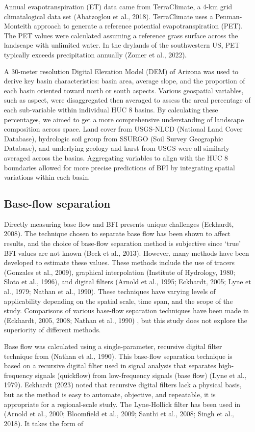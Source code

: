 \documentclass[
]{agujournal2019}
\begin{document}
Annual evapotranspiration (ET) data came from TerraClimate, a 4-km grid
climatalogical data set (Abatzoglou et al., 2018). TerraClimate uses a
Penman-Monteith approach to generate a reference potential
evapotranspiration (PET). The PET values were calculated assuming a
reference grass surface across the landscape with unlimited water. In
the drylands of the southwestern US, PET typically exceeds precipitation
annually (Zomer et al., 2022).

A 30-meter resolution Digital Elevation Model (DEM) of Arizona was used
to derive key basin characteristics: basin area, average slope, and the
proportion of each basin oriented toward north or south aspects. Various
geospatial variables, such as aspect, were disaggregated then averaged
to assess the areal percentage of each sub-variable within individual
HUC 8 basins. By calculating these percentages, we aimed to get a more
comprehensive understanding of landscape composition across space. Land
cover from USGS-NLCD (National Land Cover Database), hydrologic soil
group from SSURGO (Soil Survey Geographic Database), and underlying
geology and karst from USGS were all similarly averaged across the
basins. Aggregating variables to align with the HUC 8 boundaries allowed
for more precise predictions of BFI by integrating spatial variations
within each basin.

\subsection{Base-flow separation}\label{sec-bf_sep}

Directly measuring base flow and BFI presents unique challenges
(Eckhardt, 2008). The technique chosen to separate base flow has been
shown to affect results, and the choice of base-flow separation method
is subjective since `true' BFI values are not known (Beck et al., 2013).
However, many methods have been developed to estimate these values.
These methods include the use of tracers (Gonzales et al., 2009),
graphical interpolation (Institute of Hydrology, 1980; Sloto et al.,
1996), and digital filters (Arnold et al., 1995; Eckhardt, 2005; Lyne et
al., 1979; Nathan et al., 1990). These techniques have varying levels of
applicability depending on the spatial scale, time span, and the scope
of the study. Comparisons of various base-flow separation techniques
have been made in (Eckhardt, 2005, 2008; Nathan et al., 1990) , but this
study does not explore the superiority of different methods.

Base flow was calculated using a single-parameter, recursive digital
filter technique from (Nathan et al., 1990). This base-flow separation
technique is based on a recursive digital filter used in signal analysis
that separates high-frequency signals (quickflow) from low-frequency
signals (base flow) (Lyne et al., 1979). Eckhardt (2023) noted that
recursive digital filters lack a physical basis, but as the method is
easy to automate, objective, and repeatable, it is appropriate for a
regional-scale study. The Lyne-Hollick filter has been used in (Arnold
et al., 2000; Bloomfield et al., 2009; Santhi et al., 2008; Singh et
al., 2018). It takes the form of
\end{document}
